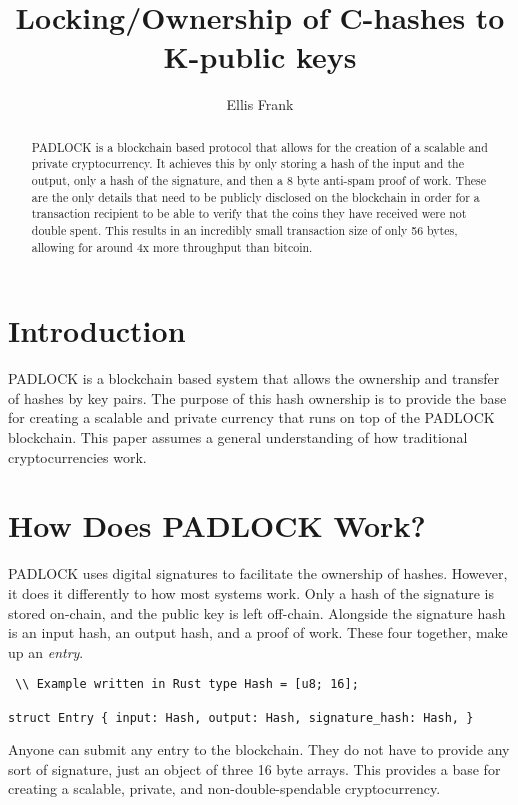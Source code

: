 \documentclass[12pt, letterpaper]{article} \usepackage[utf8]{inputenc}
\title{%
Locking/Ownership of C-hashes to K-public keys } \author{Ellis Frank}
\begin{document}
\maketitle

\begin{abstract} PADLOCK is a blockchain based protocol that allows for the
creation of a scalable and private cryptocurrency. It achieves this by only
storing a hash of the input and the output, only a hash of the signature, and
then a 8 byte anti-spam proof of work. These are the only details that need to
be publicly disclosed on the blockchain in order for a transaction recipient to
be able to verify that the coins they have received were not double spent. This
results in an incredibly small transaction size of only 56 bytes, allowing for
around 4x more throughput than bitcoin. \end{abstract}

\section{Introduction} PADLOCK is a blockchain based system that allows the
ownership and transfer of hashes by key pairs. The purpose of this hash
ownership is to provide the base for creating a scalable and private currency
that runs on top of the PADLOCK blockchain. This paper assumes a general
understanding of how traditional cryptocurrencies work.

\section{How Does PADLOCK Work?} PADLOCK uses digital signatures to facilitate
the ownership of hashes. However, it does it differently to how most systems
work. Only a hash of the signature is stored on-chain, and the public key is
left off-chain. Alongside the signature hash is an input hash, an output hash,
and a proof of work. These four together, make up an \textit{entry}.

\begin{verbatim} \\ Example written in Rust type Hash = [u8; 16];

struct Entry { input: Hash, output: Hash, signature_hash: Hash, } \end{verbatim}

Anyone can submit any entry to the blockchain. They do not have to provide any
sort of signature, just an object of three 16 byte arrays. This provides a base
for creating a scalable, private, and non-double-spendable cryptocurrency.
\end{document}
